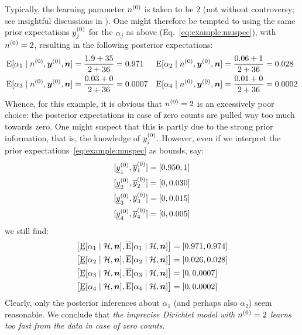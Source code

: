 Typically, the learning parameter $n^{(0)}$ is taken to be $2$
(not without controversy; see insightful discussions in \textcite{1996:walley::idm}).
One might therefore be tempted to using the same prior expectations
$y^{(0)}_j$ for the $\alpha_j$ as above (Eq.~\eqref{eq:example:muspec}), with $n^{(0)}=2$,
resulting in the following posterior expectations:
\begin{align*}
  \operatorname{E}[\alpha_1\mid n^{(0)},{\bm y}^{(0)},{\bm n}] &= \frac{1.9 + 35}{2 + 36} = 0.971
  &
  \operatorname{E}[\alpha_2\mid n^{(0)},{\bm y}^{(0)},{\bm n}] &= \frac{0.06 + 1}{2 + 36} = 0.028
  \\
  \operatorname{E}[\alpha_3\mid n^{(0)},{\bm y}^{(0)},{\bm n}] &= \frac{0.03 + 0}{2 + 36} = 0.0007
  &
  \operatorname{E}[\alpha_4\mid n^{(0)},{\bm y}^{(0)},{\bm n}] &= \frac{0.01 + 0}{2 + 36} = 0.0002
\end{align*}
Whence, for this example, it is obvious that $n^{(0)}=2$ is an excessively poor choice:
the posterior expectations in case of zero counts are pulled way too much towards zero.
One might suspect that this is partly due to the strong prior information,
that is, the knowledge of $y^{(0)}_j$.
However, even if we interpret the prior expectations~\eqref{eq:example:muspec} as bounds, say:
\begin{subequations}
  \label{eq:example:tintervals}
\begin{align} %
  [\yzl_1,\yzu_1] &= [0.950,1]
  \\
  [\yzl_2,\yzu_2] &= [0,0.030]
  \\
  [\yzl_3,\yzu_3] &= [0,0.015]
  \\
  [\yzl_4,\yzu_4] &= [0,0.005]
\end{align}
\end{subequations}
we still find:
\begin{subequations}
\begin{align*}
  \big[
  \El[\alpha_1\mid\mathcal{H},\vec{n}] %
  ,
  \Eu[\alpha_1\mid\mathcal{H},\vec{n}] %
  \big]
  &=
  [
  0.971
  ,
  0.974
  ]
  \\
  \big[
  \El[\alpha_2\mid\mathcal{H},\vec{n}] %
  ,
  \Eu[\alpha_2\mid\mathcal{H},\vec{n}] %
  \big]
  &=
  [
  0.026
  ,
  0.028
  ]
  \\
  \big[
  \El[\alpha_3\mid\mathcal{H},\vec{n}] %
  ,
  \Eu[\alpha_3\mid\mathcal{H},\vec{n}] %
  \big]
  &=
  [
  0
  ,
  0.0007
  ]
  \\
  \big[
  \El[\alpha_4\mid\mathcal{H},\vec{n}] %
  ,
  \Eu[\alpha_4\mid\mathcal{H},\vec{n}] %
  \big]
  &=
  [
  0
  ,
  0.0002
  ]
\end{align*}
\end{subequations}
Clearly, only the posterior inferences about $\alpha_1$ (and perhaps also $\alpha_2$) seem reasonable.
We conclude that \emph{the imprecise Dirichlet model with $n^{(0)}=2$ learns too fast from the data in case of zero counts}.

